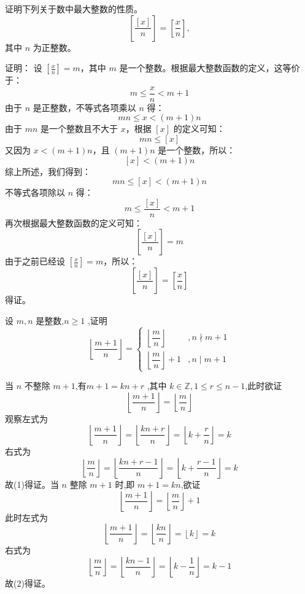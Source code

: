 \begin{questions}
    \question 证明下列关于数中最大整数的性质。
\[
\left[\frac{[x]}{n}\right] = \left[\frac{x}{n}\right],
\]
其中 $n$ 为正整数。
\begin{solution}
证明：
设 $\left[\frac{x}{n}\right] = m$，其中 $m$ 是一个整数。根据最大整数函数的定义，这等价于：
\[
m \leq \frac{x}{n} < m + 1
\]
由于 $n$ 是正整数，不等式各项乘以 $n$ 得：
\[
mn \leq x < (m + 1)n
\]
由于 $mn$ 是一个整数且不大于 $x$，根据 $[x]$ 的定义可知：
\[
mn \leq [x]
\]
又因为 $x < (m + 1)n$，且 $(m + 1)n$ 是一个整数，所以：
\[
[x] < (m + 1)n
\]
综上所述，我们得到：
\[
mn \leq [x] < (m + 1)n
\]
不等式各项除以 $n$ 得：
\[
m \leq \frac{[x]}{n} < m + 1
\]
再次根据最大整数函数的定义可知：
\[
\left[\frac{[x]}{n}\right] = m
\]
由于之前已经设 $\left[\frac{x}{n}\right] = m$，所以：
\[
\left[\frac{[x]}{n}\right] = \left[\frac{x}{n}\right]
\]
得证。
\end{solution}

    \question 设 $m, n$ 是整数,$n \ge 1$ ,证明 
    \[
    \left\lfloor \dfrac{m+1}{n} \right\rfloor = 
    \begin{cases} 
    \left\lfloor \dfrac{m}{n} \right\rfloor &,n \nmid m+1 \\[8pt]
    \left\lfloor \dfrac{m}{n} \right\rfloor + 1 &,n \mid m+1
    \end{cases}
    \]
    \begin{solution}
        当 $n$ 不整除 $m+1$,有$m+1 = kn+r$ ,其中 $k \in \mathbb{Z},1 \le r \le n-1$,此时欲证 
        \[
        \left\lfloor \frac{m+1}{n} \right\rfloor = \left\lfloor \frac{m}{n} \right\rfloor \tag{1}
        \]
        观察左式为
        \[
        \left\lfloor \frac{m+1}{n} \right\rfloor = \left\lfloor \frac{kn+r}{n} \right\rfloor = \left\lfloor k + \frac{r}{n} \right\rfloor = k 
        \]
        右式为
        \[
        \left\lfloor \frac{m}{n} \right\rfloor = \left\lfloor \frac{kn+r-1}{n} \right\rfloor = \left\lfloor k + \frac{r-1}{n} \right\rfloor = k
        \]
        故(1)得证。当 $n$ 整除 $m+1$ 时,即 $m+1 = kn$,欲证
        \[
        \left\lfloor \frac{m+1}{n} \right\rfloor = \left\lfloor \frac{m}{n} \right\rfloor + 1 \tag{2}
        \]
        此时左式为
        \[
        \left\lfloor \frac{m+1}{n} \right\rfloor = \left\lfloor \frac{kn}{n} \right\rfloor = \left\lfloor k \right\rfloor = k
        \]
        右式为
        \[
        \left\lfloor \frac{m}{n} \right\rfloor = \left\lfloor \frac{kn-1}{n} \right\rfloor = \left\lfloor k - \frac{1}{n} \right\rfloor = k-1 
        \]
        故(2)得证。
    \end{solution}


\end{questions}
